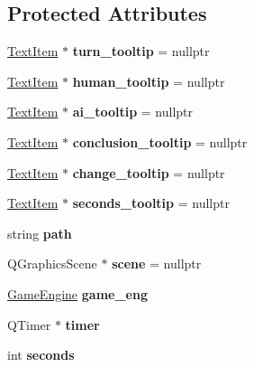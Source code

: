 \subsection*{Protected Attributes}
\begin{DoxyCompactItemize}
\item 
\hyperlink{class_text_item}{Text\+Item} $\ast$ {\bfseries turn\+\_\+tooltip} = nullptr\hypertarget{class_game_view_ad2bffcf684b7e40e9253b803f7e551e3}{}\label{class_game_view_ad2bffcf684b7e40e9253b803f7e551e3}

\item 
\hyperlink{class_text_item}{Text\+Item} $\ast$ {\bfseries human\+\_\+tooltip} = nullptr\hypertarget{class_game_view_a94384f3324a363d01a6a032fcc5343d3}{}\label{class_game_view_a94384f3324a363d01a6a032fcc5343d3}

\item 
\hyperlink{class_text_item}{Text\+Item} $\ast$ {\bfseries ai\+\_\+tooltip} = nullptr\hypertarget{class_game_view_a91eca658fe5c578738ac3df698b2c764}{}\label{class_game_view_a91eca658fe5c578738ac3df698b2c764}

\item 
\hyperlink{class_text_item}{Text\+Item} $\ast$ {\bfseries conclusion\+\_\+tooltip} = nullptr\hypertarget{class_game_view_a2594d4271aa9afcde50aab83ef78f385}{}\label{class_game_view_a2594d4271aa9afcde50aab83ef78f385}

\item 
\hyperlink{class_text_item}{Text\+Item} $\ast$ {\bfseries change\+\_\+tooltip} = nullptr\hypertarget{class_game_view_a9f2dcc56b12ec541b5a7882ec1abb2e7}{}\label{class_game_view_a9f2dcc56b12ec541b5a7882ec1abb2e7}

\item 
\hyperlink{class_text_item}{Text\+Item} $\ast$ {\bfseries seconds\+\_\+tooltip} = nullptr\hypertarget{class_game_view_a28bfa10f16a992c83d36994c334e208c}{}\label{class_game_view_a28bfa10f16a992c83d36994c334e208c}

\item 
string {\bfseries path}\hypertarget{class_game_view_a396325f196775191890d3262ecb5e9ff}{}\label{class_game_view_a396325f196775191890d3262ecb5e9ff}

\item 
Q\+Graphics\+Scene $\ast$ {\bfseries scene} = nullptr\hypertarget{class_game_view_aa96ff0163839f95478ed0de98d3e4e51}{}\label{class_game_view_aa96ff0163839f95478ed0de98d3e4e51}

\item 
\hyperlink{class_game_engine}{Game\+Engine} {\bfseries game\+\_\+eng}\hypertarget{class_game_view_a1f53dd762f200a230c3b90510c14a30a}{}\label{class_game_view_a1f53dd762f200a230c3b90510c14a30a}

\item 
Q\+Timer $\ast$ {\bfseries timer}\hypertarget{class_game_view_ab651668a749d0a823b67b5b260be2125}{}\label{class_game_view_ab651668a749d0a823b67b5b260be2125}

\item 
int {\bfseries seconds}\hypertarget{class_game_view_a005c0fe1f5c3b898ae4ec7ee4496ebab}{}\label{class_game_view_a005c0fe1f5c3b898ae4ec7ee4496ebab}

\end{DoxyCompactItemize}
